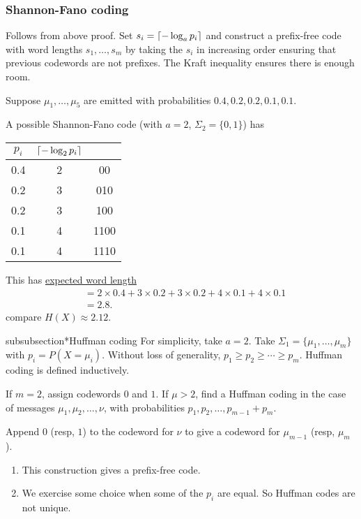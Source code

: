 \documentclass{article}
\DeclarePairedDelimiter{\ceil}{\lceil}{\rceil}
\begin{document}
\subsubsection*{Shannon-Fano coding}
Follows from above proof.
Set $s_i = \ceil{-\log_a p_i}$ and construct a prefix-free code with word lengths $s_1, \dotsc, s_m$ by taking the $s_i$ in increasing order ensuring that previous codewords are not prefixes.
The Kraft inequality ensures there is enough room.
\begin{eg}
    Suppose $\mu_1, \dotsc, \mu_5$ are emitted with probabilities $0.4, 0.2, 0.2, 0.1, 0.1$.

    A \hypertarget{ex:shannonfano1}{possible Shannon-Fano} code (with $a=2$, $\Sigma_2 = \{0, 1\}$) has
    \begin{center}
    \begin{tabular}{c c c}
        $p_i$ & $\ceil{-\log_2 p_i}$ & \\
        \hline
        0.4 & 2 & 00 \\
        0.2 & 3 & 010 \\
        0.2 & 3 & 100 \\
        0.1 & 4 & 1100 \\
        0.1 & 4 & 1110
    \end{tabular}
    \end{center}
    This has \hyperlink{def:ewl}{expected word length}
    \begin{align*}
        &= 2 \times 0.4 + 3 \times 0.2 + 3 \times 0.2 + 4 \times 0.1 + 4 \times 0.1 \\
        &= 2.8.
    \end{align*}
    compare $H(X) \approx 2.12$.
\end{eg}

subsubsection*{Huffman coding}
For simplicity, take $a=2$.
Take $\Sigma_1=\{\mu_1, \dotsc, \mu_m\}$ with $p_i = P(X = \mu_i)$. Without loss of generality, $p_1 \geq p_2 \geq \dotsb \geq p_m$.
Huffman coding is defined inductively.

If $m=2$, assign codewords $0$ and $1$. If $\mu > 2$, find a Huffman coding in the case of messages $\mu_1, \mu_2, \dotsc, \nu$, with probabilities $p_1, p_2, \dotsc, p_{m-1} + p_m$.

Append $0$ (resp, $1$) to the codeword for $\nu$ to give a codeword for $\mu_{m-1}$ (resp, $\mu_m$).

\begin{remark}
    \leavevmode
    \begin{enumerate}[label=\roman*)]
        \item This construction gives a prefix-free code.
        \item We exercise some choice when some of the $p_i$ are equal. So Huffman codes are not unique.
    \end{enumerate}
\end{remark}
\end{document}
